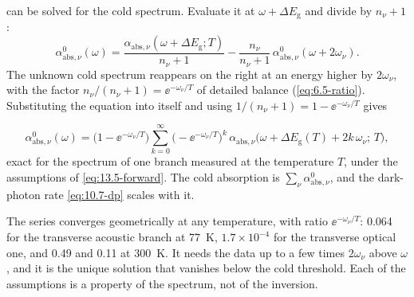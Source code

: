  can be solved for the cold spectrum. Evaluate it at $\omega + \Delta E_{\mathrm{g}}$ and divide by $n_\nu + 1$:
\begin{equation*}
  \alpha^0_{\mathrm{abs},\nu}(\omega) = \frac{\alpha_{\mathrm{abs},\nu}(\omega + \Delta E_{\mathrm{g}};T)}{n_\nu + 1} - \frac{n_\nu}{n_\nu + 1}\,\alpha^0_{\mathrm{abs},\nu}(\omega + 2\omega_\nu) .
\end{equation*}
The unknown cold spectrum reappears on the right at an energy higher by $2\omega_\nu$, with the factor $n_\nu/(n_\nu + 1) = \ee^{-\omega_\nu/T}$ of detailed balance (\cref{eq:6.5-ratio}). Substituting the equation into itself and using $1/(n_\nu + 1) = 1 - \ee^{-\omega_\nu/T}$ gives
\begin{keyresult}
\begin{equation}
  \alpha^0_{\mathrm{abs},\nu}(\omega) = \bigl(1 - \ee^{-\omega_\nu/T}\bigr)\sum_{k=0}^{\infty}\bigl(-\ee^{-\omega_\nu/T}\bigr)^k\,\alpha_{\mathrm{abs},\nu}\bigl(\omega + \Delta E_{\mathrm{g}}(T) + 2k\,\omega_\nu;\,T\bigr) ,
  \label{eq:13.5-inverse}
\end{equation}
exact for the spectrum of one branch measured at the temperature $T$, under the assumptions of \cref{eq:13.5-forward}. The cold absorption is $\sum_\nu\alpha^0_{\mathrm{abs},\nu}$, and the dark-photon rate \cref{eq:10.7-dp} scales with it.
\end{keyresult}
\noindent The series converges geometrically at any temperature, with ratio $\ee^{-\omega_\nu/T}$: 0.064 for the transverse acoustic branch at \SI{77}{K}, $1.7\times10^{-4}$ for the transverse optical one, and 0.49 and 0.11 at \SI{300}{K}. It needs the data up to a few times $2\omega_\nu$ above $\omega$, and it is the unique solution that vanishes below the cold threshold. Each of the assumptions is a property of the spectrum, not of the inversion.

